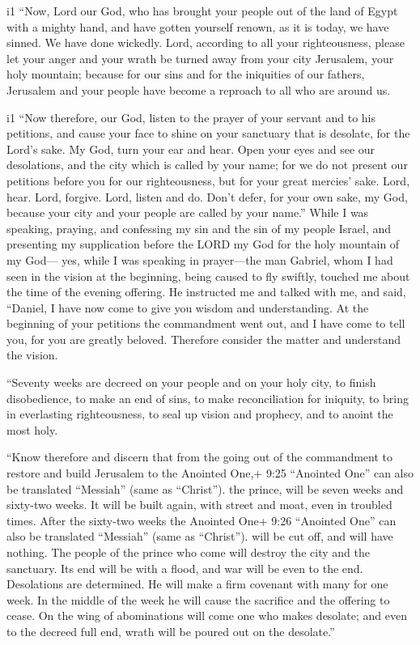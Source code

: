 i1 ``Now, Lord our God, who has brought your people out of
the land of Egypt with a mighty hand, and have gotten yourself renown,
as it is today, we have sinned. We have done wickedly. 
Lord, according to all your righteousness, please let your anger and
your wrath be turned away from your city Jerusalem, your holy mountain;
because for our sins and for the iniquities of our fathers, Jerusalem
and your people have become a reproach to all who are around us.

i1 ``Now therefore, our God, listen to the prayer of your
servant and to his petitions, and cause your face to shine on your
sanctuary that is desolate, for the Lord's sake.  My God,
turn your ear and hear. Open your eyes and see our desolations, and the
city which is called by your name; for we do not present our petitions
before you for our righteousness, but for your great mercies' sake.
 Lord, hear. Lord, forgive. Lord, listen and do. Don't
defer, for your own sake, my God, because your city and your people are
called by your name.''  While I was speaking, praying, and
confessing my sin and the sin of my people Israel, and presenting my
supplication before the LORD my God for the holy mountain of my God---
 yes, while I was speaking in prayer---the man Gabriel,
whom I had seen in the vision at the beginning, being caused to fly
swiftly, touched me about the time of the evening offering.
 He instructed me and talked with me, and said, ``Daniel, I
have now come to give you wisdom and understanding.  At the
beginning of your petitions the commandment went out, and I have come to
tell you, for you are greatly beloved. Therefore consider the matter and
understand the vision.

 ``Seventy weeks are decreed on your people and on your
holy city, to finish disobedience, to make an end of sins, to make
reconciliation for iniquity, to bring in everlasting righteousness, to
seal up vision and prophecy, and to anoint the most holy.

 ``Know therefore and discern that from the going out of
the commandment to restore and build Jerusalem to the Anointed One,+
9:25 ``Anointed One'' can also be translated ``Messiah'' (same as
``Christ''). the prince, will be seven weeks and sixty-two weeks. It
will be built again, with street and moat, even in troubled times.
 After the sixty-two weeks the Anointed One+ 9:26
``Anointed One'' can also be translated ``Messiah'' (same as
``Christ''). will be cut off, and will have nothing. The people of the
prince who come will destroy the city and the sanctuary. Its end will be
with a flood, and war will be even to the end. Desolations are
determined.  He will make a firm covenant with many for one
week. In the middle of the week he will cause the sacrifice and the
offering to cease. On the wing of abominations will come one who makes
desolate; and even to the decreed full end, wrath will be poured out on
the desolate.''

